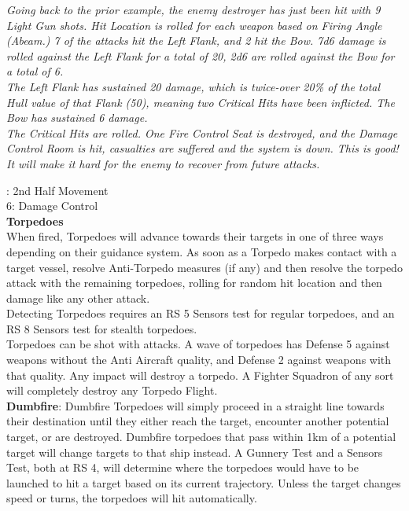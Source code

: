 \documentclass[a4paper, twocolumn, openany]{book}
\newlength{\indentlen}
\newcommand{\tabto}[1]{\setlength{\leftskip}{#1\indentlen}}
\begin{document}
{\tabto{1}
{\itshape
Going back to the prior example, the enemy destroyer has just been hit with 9 Light Gun
shots. Hit Location is rolled for each weapon based on Firing Angle (Abeam.) 7 of the
attacks hit the Left Flank, and 2 hit the Bow. 7d6 damage is rolled against the Left Flank
for a total of 20, 2d6 are rolled against the Bow for a total of 6.\\
The Left Flank has sustained 20 damage, which is twice-over 20\% of the total Hull value
of that Flank (50), meaning two Critical Hits have been inflicted.
The Bow has sustained 6 damage.\\
The Critical Hits are rolled. One Fire Control Seat is destroyed, and the Damage Control
Room is hit, casualties are suffered and the system is down. This is good! It will make it
hard for the enemy to recover from future attacks.\\
}

\tabto{0}
: 2nd Half Movement\\
6: Damage Control\\

{\bfseries Torpedoes\\}
When fired, Torpedoes will advance towards their targets in one of three ways depending on
their guidance system. As soon as a Torpedo makes contact with a target vessel, resolve
Anti-Torpedo measures (if any) and then resolve the torpedo attack with the remaining
torpedoes, rolling for random hit location and then damage like any other attack.\\

Detecting Torpedoes requires an RS 5 Sensors test for regular torpedoes, and an RS 8 Sensors
test for stealth torpedoes.\\

Torpedoes can be shot with attacks. A wave of torpedoes has Defense 5 against weapons
without the Anti Aircraft quality, and Defense 2 against weapons with that quality. Any impact
will destroy a torpedo. A Fighter Squadron of any sort will completely destroy any Torpedo
Flight.\\

{\bfseries Dumbfire}: Dumbfire Torpedoes will simply proceed in a straight line towards their destination
until they either reach the target, encounter another potential target, or are destroyed. Dumbfire
torpedoes that pass within 1km of a potential target will change targets to that ship instead. A
Gunnery Test and a Sensors Test, both at RS 4, will determine where the torpedoes would have
to be launched to hit a target based on its current trajectory. Unless the target changes speed or
turns, the torpedoes will hit automatically.\\

}
\end{document}
